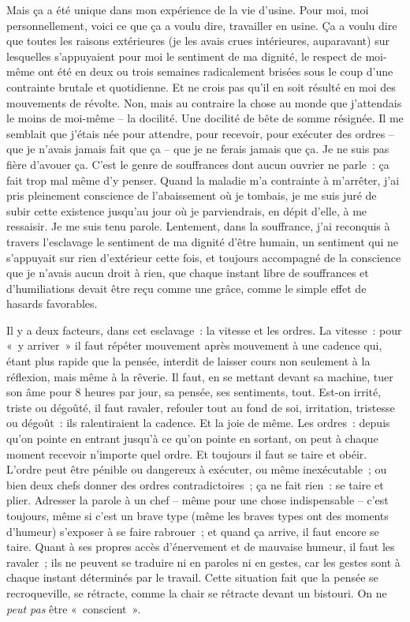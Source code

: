 \documentclass[french,twoside]{book} %
\begin{document}
Mais ça a été unique dans mon expérience de la vie d'usine. Pour moi, moi personnellement, voici ce que ça a voulu dire, travailler en usine. Ça a voulu dire que toutes les raisons extérieures (je les avais crues intérieures, auparavant) sur lesquelles s'appuyaient pour moi le sentiment de ma dignité, le respect de moi-même ont été en deux ou trois semaines radicalement brisées sous le coup d'une contrainte brutale et quotidienne. Et ne crois pas qu'il en soit résulté en moi des mouvements de révolte. Non, mais au contraire la chose au monde que j'attendais le moins de moi-même – la docilité. Une docilité de bête de somme résignée. Il me semblait que j'étais née pour attendre, pour recevoir, pour exécuter des ordres – que je n'avais jamais fait que ça – que je ne ferais jamais que ça. Je ne suis pas fière d'avouer ça. C'est le genre de souffrances dont aucun ouvrier ne parle : ça fait trop mal même d'y penser. Quand la maladie m'a contrainte à m'arrêter, j'ai pris pleinement conscience de l'abaissement où je tombais, je me suis juré de subir cette existence jusqu'au jour où je parviendrais, en dépit d'elle, à me ressaisir. Je me suis tenu parole. Lentement, dans la souffrance, j'ai reconquis à travers l'esclavage le sentiment de ma dignité d'être humain, un sentiment qui ne s'appuyait sur rien d'extérieur cette fois, et toujours accompagné de la conscience que je n'avais aucun droit à rien, que chaque instant libre de souffrances et d'humiliations devait être reçu comme une grâce, comme le simple effet de hasards favorables.\par
Il y a deux facteurs, dans cet esclavage : la vitesse et les ordres. La vitesse : pour « y arriver » il faut répéter mouvement après mouvement à une cadence qui, étant plus rapide que la pensée, interdit de laisser cours non seulement à la réflexion, mais même à la rêverie. Il faut, en se mettant devant sa machine, tuer son âme pour 8 heures par jour, sa pensée, ses sentiments, tout. Est-on irrité, triste ou dégoûté, il faut ravaler, refouler tout au fond de soi, irritation, tristesse ou dégoût : ils ralentiraient la cadence. Et la joie de même. Les ordres : depuis qu'on pointe en entrant jusqu'à ce qu'on pointe en sortant, on peut à chaque moment recevoir n'importe quel ordre. Et toujours il faut se taire et obéir. L'ordre peut être pénible ou dangereux à exécuter, ou même inexécutable ; ou bien deux chefs donner des ordres contradictoires ; ça ne fait rien : se taire et plier. Adresser la parole à un chef – même pour une chose indispensable – c'est toujours, même si c'est un brave type (même les braves types ont des moments d'humeur) s'exposer à se faire rabrouer ; et quand ça arrive, il faut encore se taire. Quant à ses propres accès d'énervement et de mauvaise humeur, il faut les ravaler ; ils ne peuvent se traduire ni en paroles ni en gestes, car les gestes sont à chaque instant déterminés par le travail. Cette situation fait que la pensée se recroqueville, se rétracte, comme la chair se rétracte devant un bistouri. On ne {\itshape peut pas} être « conscient ».\par
\end{document}
